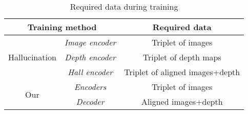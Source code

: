{
\renewcommand{\arraystretch}{1.5}
\begin{table}
	\caption{Required data during training}
	\footnotesize \center
	\begin{tabular}{c | c || c}
	\multicolumn{2}{c||}{\textbf{Training method}} & \textbf{Required data} \\
	\hline
	\multirow{3}{*}{Hallucination} & \textit{Image encoder}	& Triplet of images\\
	\cline{2-3}
								   & \textit{Depth encoder}	& Triplet of depth maps\\
	\cline{2-3}
							       & \textit{Hall encoder}	& Triplet of aligned images+depth\\
	\hline
	\multirow{2}{*}{Our} & \textit{Encoders} & Triplet of images\\
	\cline{2-3}
						 & \textit{Decoder} & Aligned images+depth\\
	\end{tabular}
\end{table}
}
